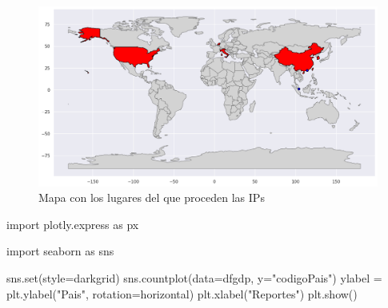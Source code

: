 \documentclass[
  letterpaper,
  DIV=11,
  numbers=noendperiod]{scrartcl}
\newenvironment{Shaded}{\begin{snugshade}}{\end{snugshade}}
\newcommand{\BuiltInTok}[1]{\textcolor[rgb]{0.00,0.23,0.31}{#1}}
\newcommand{\ImportTok}[1]{\textcolor[rgb]{0.00,0.46,0.62}{#1}}
\newcommand{\NormalTok}[1]{\textcolor[rgb]{0.00,0.23,0.31}{#1}}
\newcommand{\OperatorTok}[1]{\textcolor[rgb]{0.37,0.37,0.37}{#1}}
\newcommand{\StringTok}[1]{\textcolor[rgb]{0.13,0.47,0.30}{#1}}
\begin{document}
\begin{figure}[H]

{\centering \includegraphics{Análisis_files/figure-pdf/fig-mapa-output-1.png}

}

\caption{\label{fig-mapa}Mapa con los lugares del que proceden las IPs}

\end{figure}

\begin{Shaded}
\begin{Highlighting}[]
\ImportTok{import}\NormalTok{ plotly.express }\ImportTok{as}\NormalTok{ px}
\end{Highlighting}
\end{Shaded}

\begin{Shaded}
\begin{Highlighting}[]
\ImportTok{import}\NormalTok{ seaborn }\ImportTok{as}\NormalTok{ sns}
\end{Highlighting}
\end{Shaded}

\begin{Shaded}
\begin{Highlighting}[]
\NormalTok{sns.}\BuiltInTok{set}\NormalTok{(style}\OperatorTok{=}\StringTok{\textquotesingle{}darkgrid\textquotesingle{}}\NormalTok{)}
\NormalTok{sns.countplot(data}\OperatorTok{=}\NormalTok{dfgdp, y}\OperatorTok{=}\StringTok{"codigoPais"}\NormalTok{)}
\NormalTok{ylabel }\OperatorTok{=}\NormalTok{ plt.ylabel(}\StringTok{"Pais"}\NormalTok{, rotation}\OperatorTok{=}\StringTok{\textquotesingle{}horizontal\textquotesingle{}}\NormalTok{)}
\NormalTok{plt.xlabel(}\StringTok{"Reportes"}\NormalTok{)}
\NormalTok{plt.show()}
\end{Highlighting}
\end{Shaded}
\end{document}
